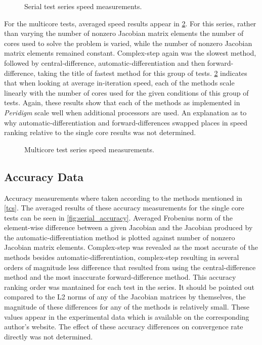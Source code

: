 \documentclass[preprint,12pt]{elsarticle}
\begin{document}
\begin{figure}[h]
  \centering
  \scalebox{.7}{}
  \caption{Serial test series speed measurements.}
  \label{fig:serial_speed}
\end{figure}

For the multicore tests, averaged speed results appear in \ref{fig:multi_speed}. For this series,
rather than varying the number of nonzero Jacobian matrix elements the number of cores used to
solve the problem is varied, while the number of nonzero Jacobian matrix elements remained constant.
Complex-step again was the slowest method, followed by central-difference, automatic-differentiation
and then forward-difference, taking the title of fastest method for this group of tests.
\ref{fig:multi_speed} indicates that when looking at average in-iteration speed, each of the
methods scale linearly with the number of cores used for the given conditions of this group of
tests. Again, these results show that each of the methods as implemented in \emph{Peridigm} scale
well when additional processors are used. An explanation as to why automatic-differentiation and
forward-differences swapped places in speed ranking relative to the single core results was not
determined. 

\begin{figure}[h]
  \centering
  \scalebox{.7}{}
  \caption{Multicore test series speed measurements.}
  \label{fig:multi_speed}
\end{figure}

\subsection{Accuracy Data}
Accuracy measurements where taken according to the methods mentioned in \ref{tcs}. The averaged
results of these accuracy measurements for the single core tests can be seen in
\ref{fig:serial_accuracy}. Averaged Frobenius norm of the element-wise difference between a given
Jacobian and the Jacobian produced by the automatic-differentiation method is plotted against number
of nonzero Jacobian matrix elements. Complex-step was revealed as the most accurate of the methods
besides automatic-differentiation, complex-step resulting in several orders of magnitude less
difference that resulted from using the central-difference method and the most inaccurate
forward-difference method. This accuracy ranking order was mantained for each test in the series. It
should be pointed out compared to the L2 norms of any of the Jacobian matrices by themselves, the
magnitude of these differences for any of the methods is relatively small. These values appear in
the experimental data which is available on the corresponding author's website. The effect of these
accuracy differences on convergence rate directly was not determined.
\end{document}
